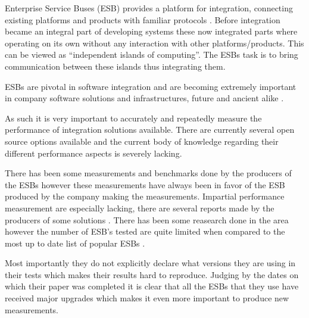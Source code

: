 \documentclass{llncs}
\begin{document}

Enterprise Service Buses (ESB) provides a platform for integration, connecting existing platforms and products with familiar protocols \cite{falko07} . Before integration became an integral part of developing systems these now integrated parts where operating on its own without any interaction with other platforms/products. This can be viewed as ``independent islands of computing''. The ESBs task is to bring communication between these islands thus integrating them.

ESBs are pivotal in software integration and are becoming extremely important in company software solutions and infrastructures, future and ancient alike \cite{fenner03}.

As such it is very important to accurately and repeatedly measure the performance of integration solutions available. 
There are currently several open source options available \cite{mehta11} and the current body of knowledge regarding their different performance aspects is severely lacking. 


There has been some measurements and benchmarks done by the producers of the ESBs however these measurements have always been in favor of the ESB produced by the company making the measurements. 
Impartial performance measurement are especially lacking, there are several reports made by the producers of some solutions \cite{Perera07,mulevsjboss,mulevsglassfish,mulevsservicemix,mulesoft08}.
There has been some reasearch done in the area \cite{ESBthesis} however the number of ESB's tested are quite limited when compared to the most up to date list of popular ESBs \cite{mehta11}.

Most importantly they do not explicitly declare what versions they are using in their tests which makes their results hard to reproduce. 
Judging by the dates on which their paper was completed it is clear that all the ESBs that they use have received major upgrades which makes it even more important to produce new measurements.
\end{document}
